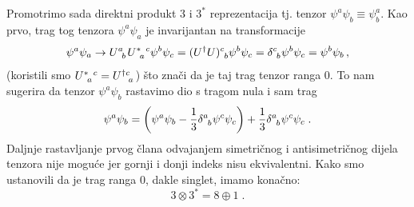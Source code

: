 Promotrimo sada direktni produkt 3 i $3^*$ reprezentacija tj.
tenzor $\psi^a \psi_b \equiv \psi^{a}_{b}$.
Kao prvo, trag tog tenzora $\psi^a \psi_a$ je invarijantan na 
transformacije
\begin{equation}
 \psi^a \psi_a \to \tensor{U}{^{a}_{b}}\tensor{U}{^*_a^c} \psi^b \psi_c
= \tensor{(U^\dagger U)}{^c_b} \psi^b \psi_c
= \tensor{\delta}{^c_b} \psi^b \psi_c = \psi^b \psi_b \,,
\end{equation}
(koristili smo $\tensor{U}{^*_a^c}=\tensor{U}{^\dagger^c_a}$) 
što znači da je taj trag  tenzor ranga 0.
To nam sugerira da tenzor $\psi^a \psi_b$ rastavimo 
 dio s tragom nula i sam trag
\begin{equation}
\psi^a \psi_b = \left(\psi^a \psi_b - \frac{1}{3}
\tensor{\delta}{^a_b}\psi^c \psi_c \right) +
\frac{1}{3} \tensor{\delta}{^a_b} \psi^c \psi_c  \;.
\label{eq:rastav3c3tensor}
\end{equation}
Daljnje rastavljanje prvog člana odvajanjem simetričnog i antisimetričnog
dijela tenzora nije moguće jer gornji i donji indeks
nisu ekvivalentni. Kako smo ustanovili da je trag ranga 0,
dakle singlet, imamo konačno:
\begin{equation}
  3 \otimes 3^* = 8 \oplus 1 \;.
\label{eq:rastav3c3}
\end{equation}

